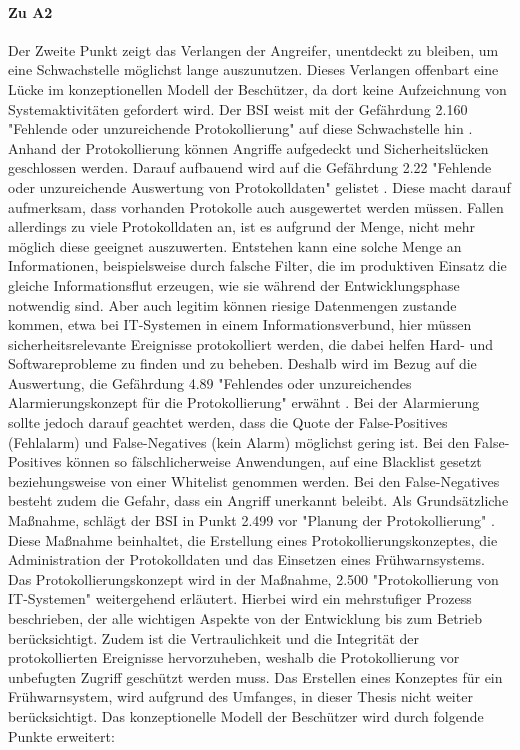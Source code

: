 \documentclass[11pt,a4paper]{report}
\begin{document}
\paragraph{Zu A2} Der Zweite Punkt zeigt das Verlangen der Angreifer, unentdeckt zu bleiben, um eine Schwachstelle möglichst lange auszunutzen. Dieses Verlangen offenbart eine Lücke im konzeptionellen Modell der Beschützer, da dort keine Aufzeichnung von Systemaktivitäten gefordert wird. Der BSI weist mit der Gefährdung 2.160 "Fehlende oder unzureichende Protokollierung" auf diese Schwachstelle hin \cite{bsi_g2160}. Anhand der Protokollierung können Angriffe aufgedeckt und Sicherheitslücken geschlossen werden. Darauf aufbauend wird auf die Gefährdung 2.22 "Fehlende oder unzureichende Auswertung von Protokolldaten" gelistet \cite{bsi_g2022}. Diese macht darauf aufmerksam, dass vorhanden Protokolle auch ausgewertet werden müssen. Fallen allerdings zu viele Protokolldaten an, ist es aufgrund der Menge, nicht mehr möglich diese geeignet auszuwerten. Entstehen kann eine solche Menge an Informationen, beispielsweise durch falsche Filter, die im produktiven Einsatz die gleiche Informationsflut erzeugen, wie sie während der Entwicklungsphase notwendig sind. Aber auch legitim können riesige Datenmengen zustande kommen, etwa bei IT-Systemen in einem Informationsverbund, hier müssen sicherheitsrelevante Ereignisse protokolliert werden, die dabei helfen Hard- und Softwareprobleme zu finden und zu beheben. Deshalb wird im Bezug auf die Auswertung, die Gefährdung 4.89 "Fehlendes oder unzureichendes Alarmierungskonzept für die Protokollierung" erwähnt \cite{bsi_g4089}. Bei der Alarmierung sollte jedoch darauf geachtet werden, dass die Quote der False-Positives (Fehlalarm) und False-Negatives (kein Alarm) möglichst gering ist. Bei den False-Positives können so fälschlicherweise Anwendungen, auf eine Blacklist gesetzt beziehungsweise von einer Whitelist genommen werden. Bei den False-Negatives besteht zudem die Gefahr, dass ein Angriff unerkannt beleibt. Als Grundsätzliche Maßnahme, schlägt der BSI in Punkt 2.499 vor "Planung der Protokollierung" \cite{bsi_m2499}. Diese Maßnahme beinhaltet, die Erstellung eines Protokollierungskonzeptes, die Administration der Protokolldaten und das Einsetzen eines Frühwarnsystems. Das Protokollierungskonzept wird in der Maßnahme, 2.500 "Protokollierung von IT-Systemen" weitergehend erläutert. Hierbei wird ein mehrstufiger Prozess beschrieben, der alle wichtigen Aspekte von der Entwicklung bis zum Betrieb berücksichtigt. Zudem ist die Vertraulichkeit und die Integrität der protokollierten Ereignisse hervorzuheben, weshalb die Protokollierung vor unbefugten Zugriff geschützt werden muss. Das Erstellen eines Konzeptes für ein Frühwarnsystem, wird aufgrund des Umfanges, in dieser Thesis nicht weiter berücksichtigt.  Das konzeptionelle Modell der Beschützer wird durch folgende Punkte erweitert:
\end{document}
